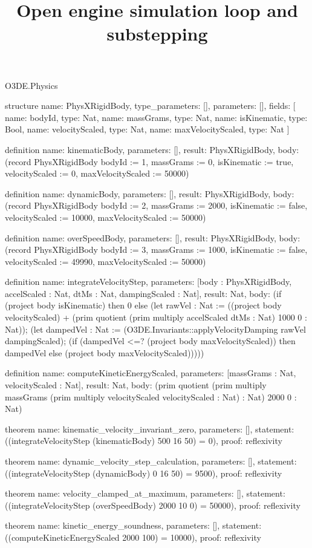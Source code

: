 \begin{lexlean}{O3DE.Physics}
\title{Open engine simulation loop and substepping}
\begin{semanticmodule}
structure{
  name: PhysXRigidBody,
  type_parameters: [],
  parameters: [],
  fields: [
    {name: bodyId, type: Nat},
    {name: massGrams, type: Nat},
    {name: isKinematic, type: Bool},
    {name: velocityScaled, type: Nat},
    {name: maxVelocityScaled, type: Nat}
  ]
}

definition{
  name: kinematicBody,
  parameters: [],
  result: PhysXRigidBody,
  body: (record PhysXRigidBody {bodyId := 1, massGrams := 0, isKinematic := true, velocityScaled := 0, maxVelocityScaled := 50000})
}

definition{
  name: dynamicBody,
  parameters: [],
  result: PhysXRigidBody,
  body: (record PhysXRigidBody {bodyId := 2, massGrams := 2000, isKinematic := false, velocityScaled := 10000, maxVelocityScaled := 50000})
}

definition{
  name: overSpeedBody,
  parameters: [],
  result: PhysXRigidBody,
  body: (record PhysXRigidBody {bodyId := 3, massGrams := 1000, isKinematic := false, velocityScaled := 49990, maxVelocityScaled := 50000})
}

definition{
  name: integrateVelocityStep,
  parameters: [body : PhysXRigidBody, accelScaled : Nat, dtMs : Nat, dampingScaled : Nat],
  result: Nat,
  body: (if (project body isKinematic) then 0 else (let rawVel : Nat := ((project body velocityScaled) + (prim quotient (prim multiply accelScaled dtMs : Nat) 1000 0 : Nat)); (let dampedVel : Nat := (O3DE.Invariants::applyVelocityDamping rawVel dampingScaled); (if (dampedVel <=? (project body maxVelocityScaled)) then dampedVel else (project body maxVelocityScaled)))))
}

definition{
  name: computeKineticEnergyScaled,
  parameters: [massGrams : Nat, velocityScaled : Nat],
  result: Nat,
  body: (prim quotient (prim multiply massGrams (prim multiply velocityScaled velocityScaled : Nat) : Nat) 2000 0 : Nat)
}

theorem{
  name: kinematic_velocity_invariant_zero,
  parameters: [],
  statement: ((integrateVelocityStep (kinematicBody) 500 16 50) = 0),
  proof: reflexivity{}
}

theorem{
  name: dynamic_velocity_step_calculation,
  parameters: [],
  statement: ((integrateVelocityStep (dynamicBody) 0 16 50) = 9500),
  proof: reflexivity{}
}

theorem{
  name: velocity_clamped_at_maximum,
  parameters: [],
  statement: ((integrateVelocityStep (overSpeedBody) 2000 10 0) = 50000),
  proof: reflexivity{}
}

theorem{
  name: kinetic_energy_soundness,
  parameters: [],
  statement: ((computeKineticEnergyScaled 2000 100) = 10000),
  proof: reflexivity{}
}
\end{semanticmodule}
\end{lexlean}
